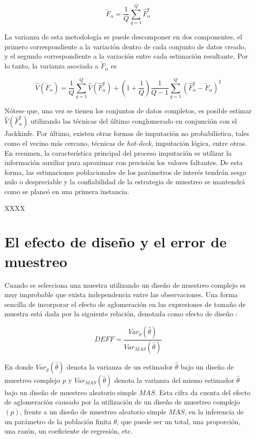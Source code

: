 \documentclass[12pt,spanish,]{book}
\begin{document}
\[
\tilde{F}_{\alpha}=\frac{1}{Q}\sum_{q=1}^Q \hat{F}_{\alpha}^{q}
\]

La varianza de esta metodología se puede descomponer en dos componentes, el primero correspondiente a la variación dentro de cada conjunto de datos creado, y el segundo correspondiente a la variación entre cada estimación resultante. Por lo tanto, la varianza asociada a \(\tilde{F}_{\alpha}\) es

\[
\hat{V}(\tilde{F}_{\alpha})
= \frac{1}{Q}\sum_{q=1}^Q \hat{V}(\hat{F}_{\alpha}^{q})
+ \left(1+\frac{1}{Q}\right)\frac{1}{Q-1}\sum_{q=1}^Q (\hat{F}_{\alpha}^{q}-\tilde{F}_{\alpha})^2
\]

Nótese que, una vez se tienen los conjuntos de datos completos, es posible estimar \(\hat{V}(\hat{F}_{\alpha}^{q})\) utilizando las técnicas del último conglomerado en conjunción con el Jackkinfe. Por último, existen otras formas de imputación no probabilística, tales como el vecino más cercano, técnicas de \emph{hot-deck}, imputación lógica, entre otras. En resumen, la característica principal del proceso imputación es utilizar la información auxiliar para aproximar con precisión los valores faltantes. De esta forma, las estimaciones poblacionales de los parámetros de interés tendrán sesgo nulo o despreciable y la confiabilidad de la estrategia de muestreo se mantendrá como se planeó en una primera instancia.

XXXX

\hypertarget{el-efecto-de-diseno-y-el-error-de-muestreo}{%
\section{El efecto de diseño y el error de muestreo}\label{el-efecto-de-diseno-y-el-error-de-muestreo}}

Cuando se selecciona una muestra utilizando un diseño de muestreo complejo es muy improbable que exista independencia entre las observaciones. Una forma sencilla de incorporar el efecto de aglomeración en las expresiones de tamaño de muestra está dada por la siguiente relación, denotada como efecto de diseño \autocite{Kish_1965}:

\[
DEFF=\frac{Var_p(\hat{\theta})}{Var_{MAS}(\hat{\theta})}
\]

En donde \(Var_p(\hat{\theta})\) denota la varianza de un estimador \(\hat{\theta}\) bajo un diseño de muestreo complejo \(p\) y \(Var_{MAS}(\hat{\theta})\) denota la varianza del mismo estimador \(\hat{\theta}\) bajo un diseño de muestreo aleatorio simple \(MAS\). Esta cifra da cuenta del efecto de aglomeración causado por la utilización de un diseño de muestreo complejo \((p)\), frente a un diseño de muestreo aleatorio simple \(MAS\), en la inferencia de un parámetro de la población finita \(\theta\), que puede ser un total, una proporción, una razón, un coeficiente de regresión, etc.
\end{document}

